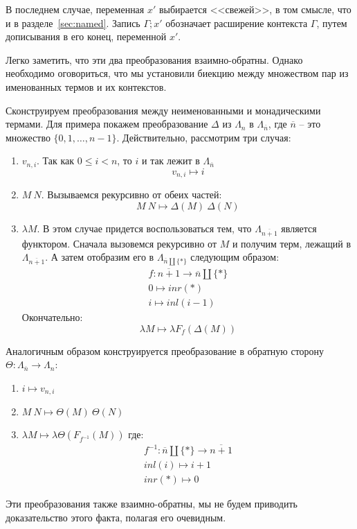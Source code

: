 В последнем случае, переменная $x'$ выбирается <<свежей>>, в том смысле, что и в разделе~\ref{sec:named}. Запись $\Gamma; x'$ обозначает расширение контекста $\Gamma$, путем дописывания в его конец, переменной $x'$.

Легко заметить, что эти два преобразования взаимно-обратны. Однако необходимо оговориться, что мы установили биекцию между множеством пар из именованных термов и их контекстов.

Сконструируем преобразования между неименованными и монадическими термами. Для примера покажем преобразование $\Delta$ из $\Lambda_{n}$ в $\Lambda_{\overline{n}}$, где $\overline{n}$ -- это множество $\{0,1,\dots, n-1\}$. Действительно, рассмотрим три случая:

\begin{enumerate}
  \item $v_{n, i}$. Так как $0 \leqslant i < n$, то $i$ и так лежит в $\Lambda_{\overline{n}}$
  $$ v_{n,i} \mapsto i $$
  \item $M\ N$. Вызываемся рекурсивно от обеих частей:
    $$ M\ N \mapsto \Delta(M)\ \Delta(N) $$
  \item $\lambda M$. В этом случае придется воспользоваться тем, что $\Lambda_{\overline{n+1}}$ является функтором. Сначала вызовемся рекурсивно от $M$ и получим терм, лежащий в $\Lambda_{\overline{n+1}}$. А затем отобразим его в $\Lambda_{\overline{n} \coprod \{*\}}$ следующим образом:
  \begin{gather*}
    f : \overline{n+1} \to \overline{n} \coprod \{*\}\\
    0 \mapsto inr(*) \\
    i \mapsto inl(i-1)
  \end{gather*}
  Окончательно:
  $$ \lambda M \mapsto \lambda F_{f}(\Delta(M))  $$
\end{enumerate}

Аналогичным образом конструируется преобразование в обратную сторону $\Theta : \Lambda_{\overline{n}} \to \Lambda_{n}$:

\begin{enumerate}
  \item $ i \mapsto v_{n, i} $
  \item $ M\ N \mapsto \Theta(M)\ \Theta(N) $
  \item $\lambda M \mapsto \lambda \Theta(F_{f^{-1}}(M))$
  где:
  \begin{gather*}
    f^{-1} : \overline{n} \coprod \{*\} \to \overline{n + 1} \\
    inl(i) \mapsto i + 1 \\
    inr(*) \mapsto 0
  \end{gather*}
\end{enumerate}

Эти преобразования также взаимно-обратны, мы не будем приводить доказательство этого факта, полагая его очевидным.
